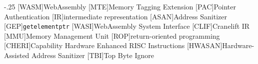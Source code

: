 \documentclass[headsepline,footsepline,footinclude=false,oneside,fontsize=11pt,paper=a4,listof=totoc,bibliography=totoc]{scrbook}
\begin{document}


\frontmatter{}





\tableofcontents{}

\mainmatter{}











\appendix{}


\begin{acronym}
	\itemsep-.25\baselineskip
	[WASM]{WebAssembly}
	[MTE]{Memory Tagging Extension}
	[PAC]{Pointer Authentication}
	[IR]{intermediate representation}
	[ASAN]{Address Sanitizer}
	[GEP]{\texttt{getelementptr}}
	[WASI]{WebAssembly System Interface}
	[CLIF]{Cranelift IR}
	[MMU]{Memory Management Unit}
	[ROP]{return-oriented programming}
	[CHERI]{Capability Hardware Enhanced RISC Instructions}
	[HWASAN]{Hardware-Assisted Address Sanitizer}
	[TBI]{Top Byte Ignore}
\end{acronym}

\listoffigures{}
\listoftables{}
\printbibliography{}
\end{document}
